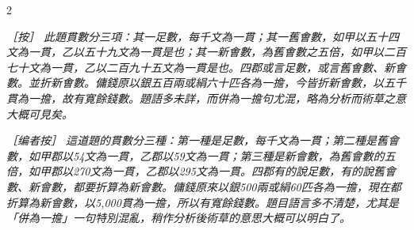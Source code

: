 \documentclass[11pt,a4paper]{article}
\newcommand{\ClassicalNote}[1]{\par\noindent\textit{［按］#1}\par}
\newcommand{\ModernNote}[1]{\par\noindent\textit{\color{notecolor}［编者按］#1}\par}
\begin{document}
\begin{paracol}{2}

\ClassicalNote{%
此題貫數分三項：其一足數，每千文為一貫；其一舊㑹數，如甲以五十四文為一貫，乙以五十九文為一貫是也；其一新㑹數，為舊㑹數之五倍，如甲以二百七十文為一貫，乙以二百九十五文為一貫是也。四郡或言足數，或言舊㑹數、新㑹數。並折新㑹數。傭錢原以銀五百兩或絹六十匹各為一擔，今皆折新㑹數，以五千貫為一擔，故有寛餘錢數。題語多未詳，而併為一擔句尤混，略為分析而術草之意大概可見矣。}

\switchcolumn

\ModernNote{%
這道題的貫數分三種：第一種是足數，每千文為一貫；第二種是舊會數，如甲郡以54文為一貫，乙郡以59文為一貫；第三種是新會數，為舊會數的五倍，如甲郡以270文為一貫，乙郡以295文為一貫。四郡有的說足數，有的說舊會數、新會數，都要折算為新會數。傭錢原來以銀500兩或絹60匹各為一擔，現在都折算為新會數，以5,000貫為一擔，所以有寬餘錢數。題目語言多不清楚，尤其是「併為一擔」一句特別混亂，稍作分析後術草的意思大概可以明白了。
}

\end{paracol}
\end{document}
